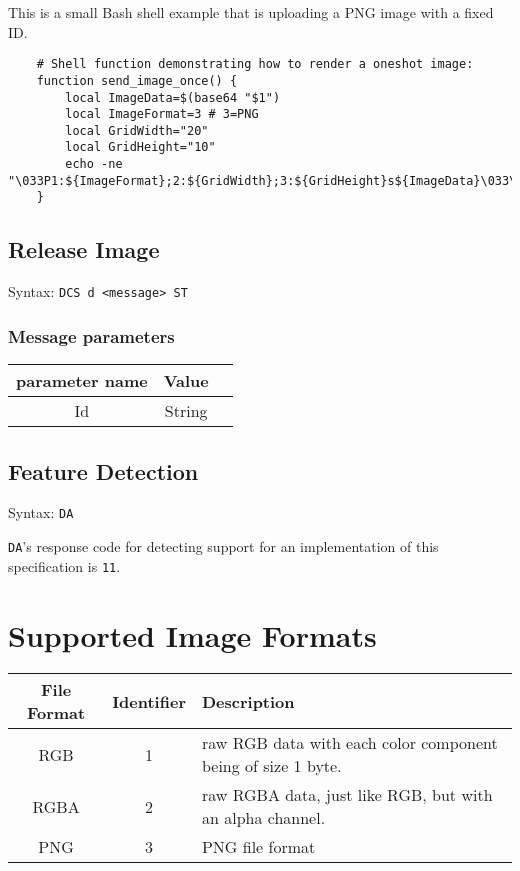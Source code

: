 \documentclass[a4paper]{article}
\newcommand{\code}[1]{\colorbox{light-gray}{\texttt{#1}}}
\newcommand{\DA}{\code{DA}}
\begin{document}
This is a small Bash shell example that is uploading a PNG image with a fixed ID.

\begin{verbatim}
    # Shell function demonstrating how to render a oneshot image:
    function send_image_once() {
        local ImageData=$(base64 "$1")
        local ImageFormat=3 # 3=PNG
        local GridWidth="20"
        local GridHeight="10"
        echo -ne "\033P1:${ImageFormat};2:${GridWidth};3:${GridHeight}s${ImageData}\033\\"
    }
\end{verbatim}

\subsection{Release Image}

Syntax: \code{DCS d <message> ST}

\subsubsection*{Message parameters}

\begin{tabular}{ |c|c|l| }
    \hline
    \textbf{parameter name}   & \textbf{Value} \\
    \hline
    Id          & String \\
    \hline
\end{tabular}

\subsection{Feature Detection}

Syntax: \DA

\DA's response code for detecting support for an implementation of this specification is \code{11}.

\section{Supported Image Formats} %

\label{sec:supported-image-formtats}

\begin{tabular}{c | c | l}
    File Format & Identifier & Description \\ \hline
    RGB         & 1          & raw RGB data with each color component being of size 1 byte. \\
    RGBA        & 2          & raw RGBA data, just like RGB, but with an alpha channel. \\
    PNG         & 3          & PNG file format \\
\end{tabular}
\end{document}

